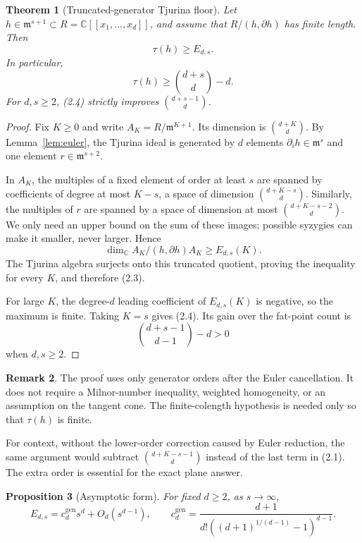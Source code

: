 \documentclass[11pt,a4paper]{article}
\newtheorem{theorem}{Theorem}[section]
\newtheorem{proposition}[theorem]{Proposition}
\theoremstyle{definition}
\newtheorem{remark}[theorem]{Remark}
\numberwithin{equation}{section}
\newcommand{\kk}{\mathbb C}
\newcommand{\m}{\mathfrak m}
\begin{document}
\begin{theorem}[Truncated-generator Tjurina floor]\label{thm:localfloor}
Let \(h\in\m^{s+1}\subset R=\kk[[x_1,\ldots,x_d]]\), and assume that
\(R/(h,\partial h)\) has finite length.  Then
\[
 \tau(h)\ge E_{d,s}.
\]
In particular,
\[
 \tau(h)\ge\binom{d+s}{d}-d.
\]
For \(d,s\ge2\), (2.4) strictly improves
\(\binom{d+s-1}{d}\).
\end{theorem}

\begin{proof}
Fix \(K\ge0\) and write \(A_K=R/\m^{K+1}\).  Its dimension is
\(\binom{d+K}{d}\).  By Lemma~\ref{lem:euler}, the Tjurina ideal is
generated by \(d\) elements \(\partial_i h\in\m^s\) and one element
\(r\in\m^{s+2}\).

In \(A_K\), the multiples of a fixed element of order at least \(s\) are
spanned by coefficients of degree at most \(K-s\), a space of dimension
\(\binom{d+K-s}{d}\).  Similarly, the multiples of \(r\) are spanned by a
space of dimension at most \(\binom{d+K-s-2}{d}\).  We only need an upper
bound on the sum of these images; possible syzygies can make it smaller,
never larger.  Hence
\[
 \dim_\kk A_K/(h,\partial h)A_K\ge E_{d,s}(K).
\]
The Tjurina algebra surjects onto this truncated quotient, proving the
inequality for every \(K\), and therefore (2.3).

For large \(K\), the degree-\(d\) leading coefficient of \(E_{d,s}(K)\) is
negative, so the maximum is finite.  Taking \(K=s\) gives (2.4).  Its gain
over the fat-point count is
\[
 \binom{d+s-1}{d-1}-d>0
\]
when \(d,s\ge2\).
\end{proof}

\begin{remark}
The proof uses only generator orders after the Euler cancellation.  It does
not require a Milnor-number inequality, weighted homogeneity, or an
assumption on the tangent cone.  The finite-colength hypothesis is needed
only so that \(\tau(h)\) is finite.
\end{remark}

For context, without the lower-order correction caused by Euler reduction,
the same argument would subtract
\(\binom{d+K-s-1}{d}\) instead of the last term in (2.1).  The extra order
is essential for the exact plane answer.

\begin{proposition}[Asymptotic form]\label{prop:asymptotic}
For fixed \(d\ge2\), as \(s\to\infty\),
\[
 E_{d,s}=c_d^{\mathrm{gen}}s^d+O_d(s^{d-1}),
 \qquad
 c_d^{\mathrm{gen}}=
 \frac{d+1}{d!\left((d+1)^{1/(d-1)}-1\right)^{d-1}}.
\]
\end{proposition}
\end{document}
